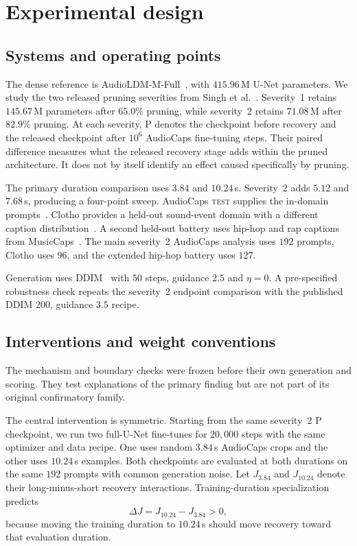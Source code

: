 \section{Experimental design}
\subsection{Systems and operating points}
The dense reference is AudioLDM-M-Full~\cite{liu2023audioldm}, with $415.96$\,M U-Net parameters. We study the two released pruning severities from Singh et al.~\cite{singh2026pruning}. Severity~1 retains $145.67$\,M parameters after $65.0\%$ pruning, while severity~2 retains $71.08$\,M after $82.9\%$ pruning. At each severity, P denotes the checkpoint before recovery and \PFT{} the released checkpoint after $10^{6}$ AudioCaps fine-tuning steps. Their paired difference measures what the released recovery stage adds within the pruned architecture. It does not by itself identify an effect caused specifically by pruning.

The primary duration comparison uses $3.84$ and $10.24$\,s. Severity~2 adds $5.12$ and $7.68$\,s, producing a four-point sweep. AudioCaps \textsc{test} supplies the in-domain prompts~\cite{kim2019audiocaps}. Clotho provides a held-out sound-event domain with a different caption distribution~\cite{drossos2020clotho}. A second held-out battery uses hip-hop and rap captions from MusicCaps~\cite{agostinelli2023musiclm}. The main severity~2 AudioCaps analysis uses $192$ prompts, Clotho uses $96$, and the extended hip-hop battery uses $127$.

Generation uses DDIM~\cite{song2021ddim} with $50$ steps, guidance $2.5$ and $\eta=0$. A pre-specified robustness check repeats the severity~2 endpoint comparison with the published DDIM $200$, guidance $3.5$ recipe.

\subsection{Interventions and weight conventions}
The mechanism and boundary checks were frozen before their own generation and scoring. They test explanations of the primary finding but are not part of its original confirmatory family.

The central intervention is symmetric. Starting from the same severity~2 P checkpoint, we run two full-U-Net fine-tunes for $20{,}000$ steps with the same optimizer and data recipe. One uses random $3.84$\,s AudioCaps crops and the other uses $10.24$\,s examples. Both checkpoints are evaluated at both durations on the same $192$ prompts with common generation noise. Let $J_{3.84}$ and $J_{10.24}$ denote their long-minus-short recovery interactions. Training-duration specialization predicts
\begin{equation}
\Delta J = J_{10.24}-J_{3.84}>0,
\end{equation}
because moving the training duration to $10.24$\,s should move recovery toward that evaluation duration.

